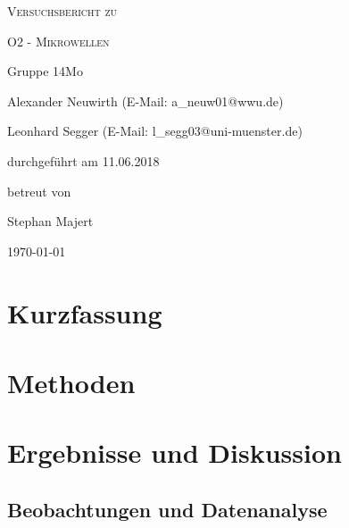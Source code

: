 \documentclass[
	a4paper,
	12pt,
	pagesize,
	ngerman
]{scrartcl}
\begin{document}
	
	\begin{titlepage}
		\centering
		{\scshape\LARGE Versuchsbericht zu \par}
		\vspace{1cm}
		{\scshape\huge O2 - Mikrowellen \par}
		\vspace{2.5cm}
		{\LARGE Gruppe 14Mo \par}
		\vspace{0.5cm}
		
		{\large Alexander Neuwirth (E-Mail: a\_neuw01@wwu.de) \par}
		{\large Leonhard Segger (E-Mail: l\_segg03@uni-muenster.de) \par}
		\vfill
		
		durchgeführt am 11.06.2018\par
		betreut von\par
		{\large Stephan Majert}
		
		\vfill
		
		{\large \today\par}
	\end{titlepage}
	\tableofcontents
	\newpage


	\section{Kurzfassung}
	
	\section{Methoden}
	
	\section{Ergebnisse und Diskussion}
	

	\subsection{Beobachtungen und Datenanalyse}
\end{document}

